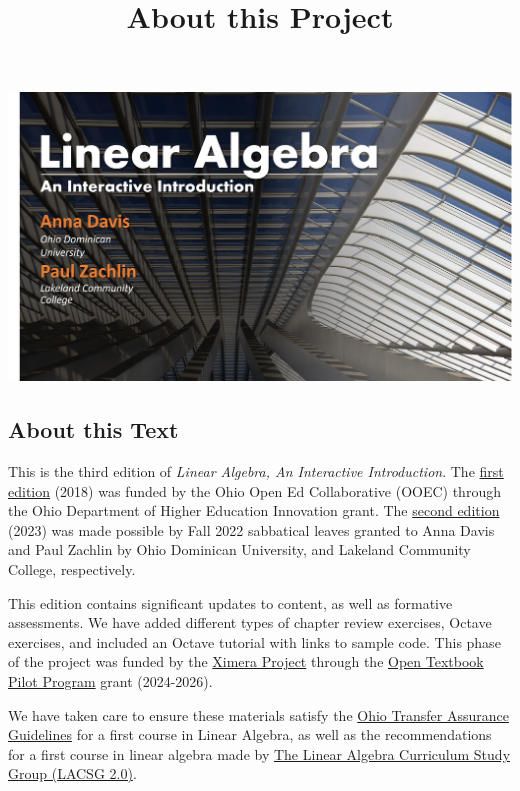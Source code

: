 \documentclass{ximera}
\title{About this Project} \license{CC BY-NC-SA 4.0}
\begin{document}
\begin{abstract}
\end{abstract}
\maketitle

\begin{image}
\includegraphics{BookCover1.jpg}
\end{image}

\subsection{About this Text}
This is the third edition of \emph{Linear Algebra, An Interactive Introduction}.  The \href{https://ximera.osu.edu/la/LinearAlgebra}{first edition} (2018) was funded by the Ohio Open Ed Collaborative (OOEC) through the Ohio Department of Higher Education Innovation grant. The \href{https://ximera.osu.edu/oerlinalg}{second edition} (2023) was made possible by Fall 2022 sabbatical leaves granted to Anna Davis and Paul Zachlin by Ohio Dominican University, and Lakeland Community College, respectively.

This edition contains significant updates to content, as well as formative assessments.  We have added different types of chapter review exercises, Octave exercises, and included an Octave tutorial with links to sample code.  This phase of the project was funded by the \href{https://github.com/XimeraProject}{Ximera Project} through the \href{https://www2.ed.gov/programs/otp/index.html}{Open Textbook Pilot Program} grant (2024-2026).

We have taken care to ensure these materials satisfy the \href{https://dam.assets.ohio.gov/image/upload/transfercredit.ohio.gov/files/transfer/tags/course-descriptions/OMT/OMT019-_ELEMENTARY_LINEAR_ALGEBRA.pdf}{Ohio Transfer Assurance Guidelines}  for a first course in Linear Algebra, as well as the recommendations for a first course in linear algebra made by \href{https://dx.doi.org/10.1090/noti2479}{The Linear Algebra Curriculum Study Group (LACSG 2.0)}.  
\end{document}
